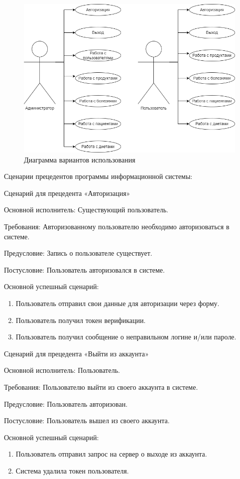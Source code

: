 \begin{figure}[H]
	\centering
	\includegraphics[width=0.7\linewidth]{"images/Диаграмма вариантов использования.drawio"}
	\caption{Диаграмма вариантов использования}
	\label{fig:dieagrammv}
\end{figure}

Сценарии прецедентов программы информационной системы:

Сценарий для прецедента «Авторизация»

Основной исполнитель: Существующий пользователь.

Требования: Авторизованному пользователю необходимо авторизоваться в системе.

Предусловие: Запись о пользователе существует.

Постусловие: Пользователь авторизовался в системе.

Основной успешный сценарий:
\begin{enumerate}
	\item Пользователь отправил свои данные для авторизации через форму.
	\item Пользователь получил токен верификации.
	\item Пользователь получил сообщение о неправильном логине и/или пароле.\\
\end{enumerate}

Сценарий для прецедента «Выйти из аккаунта»

Основной исполнитель: Пользователь.

Требования: Пользователю выйти из своего аккаунта в системе.

Предусловие: Пользователь авторизован.

Постусловие: Пользователь вышел из своего аккаунта.

Основной успешный сценарий:
\begin{enumerate}
	\item Пользователь отправил запрос на сервер о выходе из аккаунта.
	\item Система удалила токен пользователя.\\
\end{enumerate}


